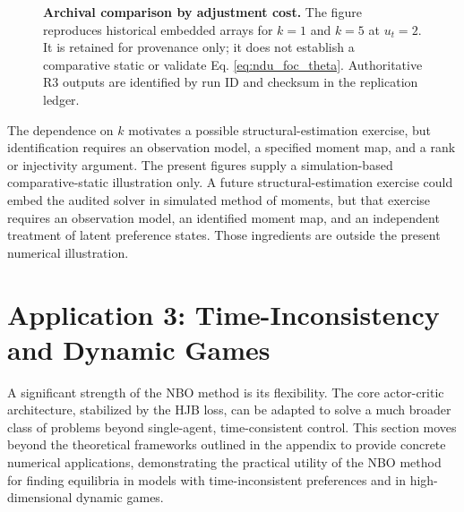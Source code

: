 \documentclass[ecta]{econsocart}
\theoremstyle{plain}
\theoremstyle{remark}
\begin{document}
\begin{figure}[H]
\centering
{}
\caption{\textbf{Archival comparison by adjustment cost.} The figure reproduces historical embedded arrays for $k=1$ and $k=5$ at $u_t=2$. It is retained for provenance only; it does not establish a comparative static or validate Eq. \ref{eq:ndu_foc_theta}. Authoritative R3 outputs are identified by run ID and checksum in the replication ledger.}
\label{fig:ndu_statics}
\end{figure}

The dependence on $k$ motivates a possible structural-estimation exercise, but identification requires an observation model, a specified moment map, and a rank or injectivity argument. The present figures supply a simulation-based comparative-static illustration only. A future structural-estimation exercise could embed the audited solver in simulated method of moments, but that exercise requires an observation model, an identified moment map, and an independent treatment of latent preference states. Those ingredients are outside the present numerical illustration.

\section{Application 3: Time-Inconsistency and Dynamic Games}
\label{sec:application_extensions}

A significant strength of the NBO method is its flexibility. The core actor-critic architecture, stabilized by the HJB loss, can be adapted to solve a much broader class of problems beyond single-agent, time-consistent control. This section moves beyond the theoretical frameworks outlined in the appendix to provide concrete numerical applications, demonstrating the practical utility of the NBO method for finding equilibria in models with time-inconsistent preferences and in high-dimensional dynamic games.
\end{document}

